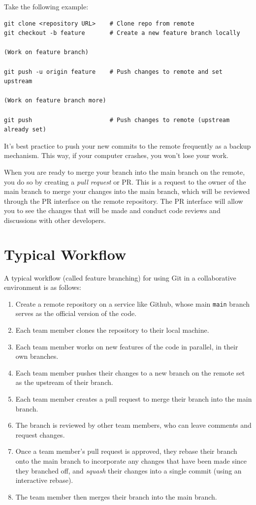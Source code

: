 \documentclass[fleqn]{article}
\begin{document}
Take the following example:

\begin{lstlisting}
git clone <repository URL>    # Clone repo from remote
git checkout -b feature       # Create a new feature branch locally

(Work on feature branch)

git push -u origin feature    # Push changes to remote and set upstream

(Work on feature branch more)

git push                      # Push changes to remote (upstream already set)
\end{lstlisting}

It's best practice to push your new commits to the remote frequently as a 
backup mechanism. This way, if your computer crashes, you won't lose your work.

When you are ready to merge your branch into the main branch on the remote, you
do so by creating a \emph{pull request} or PR. This is a request to the owner
of the main branch to merge your changes into the main branch, which will be
reviewed through the PR interface on the remote repository. The PR interface
will allow you to see the changes that will be made and conduct code reviews and
discussions with other developers.

\pagebreak

\section*{Typical Workflow}

A typical workflow (called feature branching) for using Git in a collaborative
environment is as follows:

\begin{enumerate}

    \item Create a remote repository on a service like Github, whose main
          \texttt{main} branch serves as the official version of the code.
    \item Each team member clones the repository to their local machine.
    \item Each team member works on new features of the code in parallel, in
          their own branches.
    \item Each team member pushes their changes to a new branch on the remote
          set as the upstream of their branch.
    \item Each team member creates a pull request to merge their branch into
          the main branch.
    \item The branch is reviewed by other team members, who can leave comments
          and request changes.
    \item Once a team member's pull request is approved, they rebase their
          branch onto the main branch to incorporate any changes that have been
          made since they branched off, and  \emph{squash} their changes into a
          single commit (using an interactive rebase).
    \item The team member then merges their branch into the main branch.
\end{enumerate}
\end{document}
